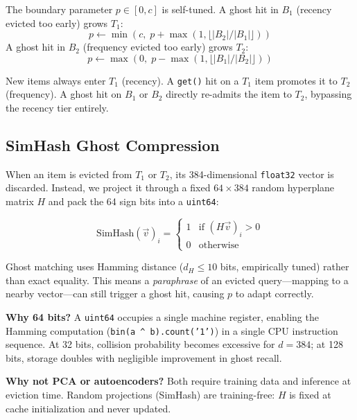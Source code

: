 \documentclass[conference,10pt]{IEEEtran}
\begin{document}
The boundary parameter $p \in [0, c]$ is self-tuned. A ghost hit in $B_1$ (recency evicted too early) grows $T_1$:
\begin{equation}
p \leftarrow \min\!\left(c,\; p + \max\!\left(1, \bigl\lfloor|B_2|/|B_1|\bigr\rfloor\right)\right)
\end{equation}
A ghost hit in $B_2$ (frequency evicted too early) grows $T_2$:
\begin{equation}
p \leftarrow \max\!\left(0,\; p - \max\!\left(1, \bigl\lfloor|B_1|/|B_2|\bigr\rfloor\right)\right)
\end{equation}

New items always enter $T_1$ (recency). A \texttt{get()} hit on a $T_1$ item promotes it to $T_2$ (frequency). A ghost hit on $B_1$ or $B_2$ directly re-admits the item to $T_2$, bypassing the recency tier entirely.

\subsection{SimHash Ghost Compression}

When an item is evicted from $T_1$ or $T_2$, its 384-dimensional \texttt{float32} vector is discarded. Instead, we project it through a fixed $64 \times 384$ random hyperplane matrix $H$ and pack the 64 sign bits into a \texttt{uint64}:

\begin{equation}
\text{SimHash}(\vec{v})_i = \begin{cases}1 & \text{if } (H\vec{v})_i > 0 \\ 0 & \text{otherwise}\end{cases}
\end{equation}

Ghost matching uses Hamming distance ($d_H \le 10$ bits, empirically tuned) rather than exact equality. This means a \textit{paraphrase} of an evicted query—mapping to a nearby vector—can still trigger a ghost hit, causing $p$ to adapt correctly.

\textbf{Why 64 bits?} A \texttt{uint64} occupies a single machine register, enabling the Hamming computation (\texttt{bin(a \^{} b).count('1')}) in a single CPU instruction sequence. At 32 bits, collision probability becomes excessive for $d=384$; at 128 bits, storage doubles with negligible improvement in ghost recall.

\textbf{Why not PCA or autoencoders?} Both require training data and inference at eviction time. Random projections (SimHash) are training-free: $H$ is fixed at cache initialization and never updated.
\end{document}
